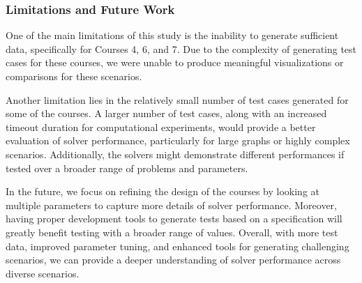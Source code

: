\subsubsection*{Limitations and Future Work}

One of the main limitations of this study is the inability to generate sufficient data, specifically for Courses 4, 6, and 7. Due to the complexity of generating test cases for these courses, we were unable to produce meaningful visualizations or comparisons for these scenarios. 

Another limitation lies in the relatively small number of test cases generated for some of the courses. A larger number of test cases, along with an increased timeout duration for computational experiments, would provide a better evaluation of solver performance, particularly for large graphs or highly complex scenarios. Additionally, the solvers might demonstrate different performances if tested over a broader range of problems and parameters.

In the future, we focus on refining the design of the courses by looking at multiple parameters to capture more details of solver performance. Moreover, having proper development tools to generate tests based on a specification will greatly benefit testing with a broader range of values. Overall, with more test data, improved parameter tuning, and enhanced tools for generating challenging scenarios, we can provide a deeper understanding of solver performance across diverse scenarios.
